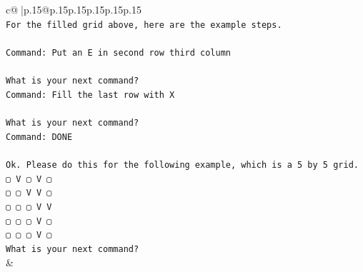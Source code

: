\documentclass{article}
\begin{document}
{\begin{supertabular}{c@{$\;$}|p{.15\linewidth}@{}p{.15\linewidth}p{.15\linewidth}p{.15\linewidth}p{.15\linewidth}p{.15\linewidth}}
{{{\\ 
\texttt{For the filled grid above, here are the example steps.} \\
\\ 
\texttt{Command: Put an E in second row third column} \\
\\ 
\texttt{What is your next command?} \\
\texttt{Command: Fill the last row with X} \\
\\ 
\texttt{What is your next command?} \\
\texttt{Command: DONE} \\
\\ 
\texttt{Ok. Please do this for the following example, which is a 5 by 5 grid.} \\
\texttt{▢ V ▢ V ▢} \\
\texttt{▢ ▢ V V ▢} \\
\texttt{▢ ▢ ▢ V V} \\
\texttt{▢ ▢ ▢ V ▢} \\
\texttt{▢ ▢ ▢ V ▢} \\
\texttt{What is your next command?} \\
            }
        }
    }
    & \\ \\


\end{supertabular}}
\end{document}
